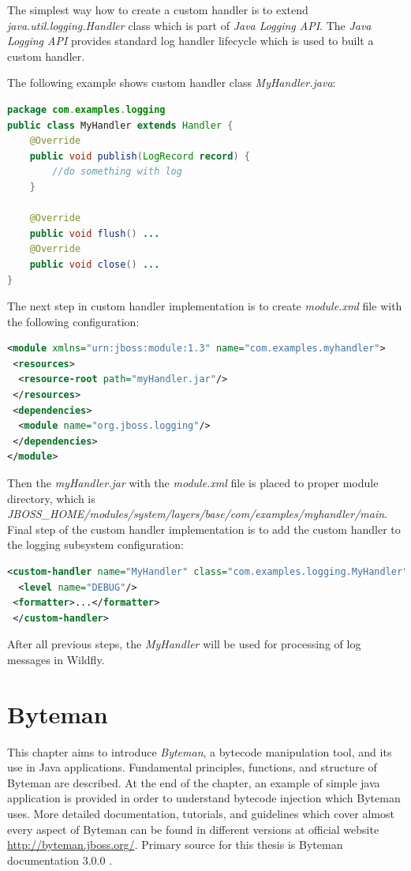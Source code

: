 \documentclass[12pt,oneside]{fithesis2}
\begin{document}
The simplest way how to create a custom handler is to extend \textit{java.util.logging.Handler} class which is part of \textit{Java Logging API}. The \textit{Java Logging API} provides standard log handler lifecycle which is used to built a custom handler.

The following example shows custom handler class \textit{MyHandler.java}:
\begin{lstlisting}[caption = Custom handler class, label = custom_handler_class, language=Java]
package com.examples.logging
public class MyHandler extends Handler {
	@Override
	public void publish(LogRecord record) {
		//do something with log
	}
	
	@Override
	public void flush() ...
	@Override
	public void close() ...
}
\end{lstlisting}
\noindent
The next step in custom handler implementation is to create \textit{module.xml} file with the following configuration:

\begin{lstlisting}[caption = Custom handler module descriptor, label = custom_handler_module_descriptor, language=XML]
<module xmlns="urn:jboss:module:1.3" name="com.examples.myhandler">
 <resources>
  <resource-root path="myHandler.jar"/>
 </resources>
 <dependencies>
  <module name="org.jboss.logging"/>
 </dependencies>    
</module>
\end{lstlisting}

\noindent
Then the \textit{myHandler.jar} with the \textit{module.xml} file is placed to proper module directory, which is \textit{JBOSS\_HOME/modules/system/layers/base/com/examples/myhandler/main}.
\noindent
Final step of the custom handler implementation is to add the custom handler to the logging subsystem configuration:
\begin{lstlisting}[caption = Adding custom handler to the logging subsystem configuration, label = custom_handler_logging_subsystem, language=XML]
 <custom-handler name="MyHandler" class="com.examples.logging.MyHandler" module="com.examples.myhandler">
  <level name="DEBUG"/>
 <formatter>...</formatter>
 </custom-handler>
\end{lstlisting}
\noindent
After all previous steps, the \textit{MyHandler} will be used for processing of log messages in Wildfly.

\chapter{Byteman}
\label{byteman_chap}
This chapter aims to introduce \textit{Byteman}, a bytecode manipulation tool, and its use in Java applications. Fundamental principles, functions, and structure of Byteman are described.
At the end of the chapter, an example of simple java application is provided in order to understand bytecode injection which Byteman uses. More detailed documentation, tutorials, and guidelines 
which cover almost every aspect of Byteman can be found in different versions at official website \url{http://byteman.jboss.org/}. Primary source for this thesis is Byteman documentation 3.0.0 \cite{byteman_doc}.
\end{document}

